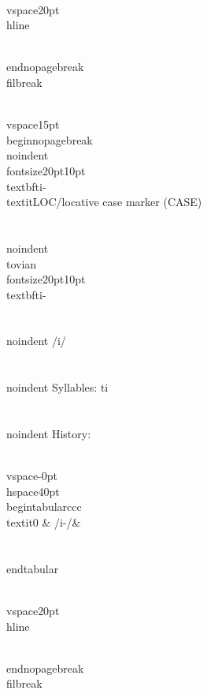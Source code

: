 \\vspace{20pt}\\hline

\\end{nopagebreak}
\\filbreak



\\vspace{15pt}
\\begin{nopagebreak}
\\noindent{\\fontsize{20pt}{10pt}\\textbf{ti-} } \\textit{LOC/locative case marker} (CASE)\\\\
\\noindent {\\tovian \\fontsize{20pt}{10pt} \\textbf{ti-} }\\\\
\\noindent /{}{\textprimstress}i/\\\\
\\noindent Syllables: ti\\\\


\\noindent History:

\\vspace{-0pt}
\\hspace{40pt}
\\begin{tabular}{ccc}
\\textit{0} & /{}i-/& \\\\
\\end{tabular}

\\vspace{20pt}\\hline

\\end{nopagebreak}
\\filbreak




